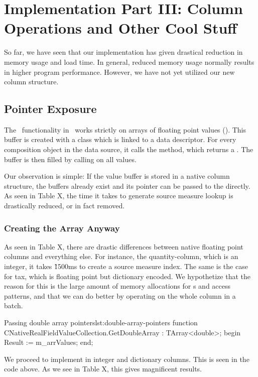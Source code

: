 \chapter{Implementation Part III: Column Operations and Other Cool Stuff}
\label{chap:Implementation Part III: Column Operations and Other Cool Stuff}
So far, we have seen that our implementation has given drastical reduction in memory usage and load time. In general, reduced memory usage normally results in higher program performance. However, we have not yet utilized our new column structure.

\section{Pointer Exposure}
\label{sec:Pointer Exposure}
The \bd~functionality in \gap~works strictly on arrays of floating point values (). This buffer is created with a  class which is linked to a data descriptor. For every composition object in the data source, it calls the  method, which returns a . The buffer is then filled by calling  on all values. 

Our observation is simple: If the value buffer is stored in a native column structure, the buffers already exist and its pointer can be passed to the  directly. As seen in Table X, the time it takes to generate source measure lookup is drastically reduced, or in fact removed.

\subsection{Creating the Array Anyway}
\label{sub:Creating the Array Anyway}
As seen in Table X, there are drastic differences between native floating point columns and everything else. For instance, the quantity-column, which is an integer, it takes \~ 1500ms to create a source measure index. The same is the case for tax, which is floating point but dictionary encoded. We hypothetize that the reason for this is the large amount of memory allocations for s and access patterns, and that we can do better by operating on the whole column in a batch.

\begin{delphicode}{Passing double array pointers}{lst:double-array-pointers}
function CNativeRealFieldValueCollection.GetDoubleArray
: TArray<double>;
begin
  Result := m_arrValues;
end;
\end{delphicode}
We proceed to implement  in integer and dictionary columns. This is seen in the code above. As we see in Table X, this gives magnificent results.

